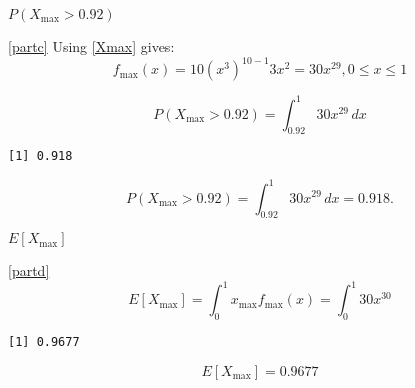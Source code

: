 \documentclass[ignorenonframetext,]{beamer}
\newenvironment{Shaded}{\begin{snugshade}}{\end{snugshade}}
\newcommand{\KeywordTok}[1]{\textcolor[rgb]{0.13,0.29,0.53}{\textbf{{#1}}}}
\newcommand{\DecValTok}[1]{\textcolor[rgb]{0.00,0.00,0.81}{{#1}}}
\newcommand{\FloatTok}[1]{\textcolor[rgb]{0.00,0.00,0.81}{{#1}}}
\newcommand{\StringTok}[1]{\textcolor[rgb]{0.31,0.60,0.02}{{#1}}}
\newcommand{\NormalTok}[1]{{#1}}
\begin{document}
\begin{frame}[fragile]{$P(X_{\textrm{max}} > 0.92)$}

\eqref{partc} Using \eqref{Xmax} gives:
\[f_{\textrm{max}}(x) = 10\left(x^3\right)^{10-1}3x^2 = 30x^{29},  0\leq x \leq 1\]

\[P(X_{\textrm{max}} > 0.92) = \int_{0.92}^{1}30x^{29}\,dx\]

\begin{Shaded}
\end{Shaded}

\begin{verbatim}
[1] 0.918
\end{verbatim}

\[P(X_{\textrm{max}} > 0.92) = \int_{0.92}^{1}30x^{29}\,dx = 0.918.\]

\end{frame}

\begin{frame}[fragile]{$E[X_{\textrm{max}}]$}

\eqref{partd}
\[E[X_{\textrm{max}}] = \int_{0}^{1}x_{\textrm{max}} f_{\textrm{max}}(x) = \int_{0}^{1}30x^{30}\]

\begin{Shaded}
\end{Shaded}

\begin{verbatim}
[1] 0.9677
\end{verbatim}

\[E[X_{\textrm{max}}] = 0.9677\]

\end{frame}
\end{document}
